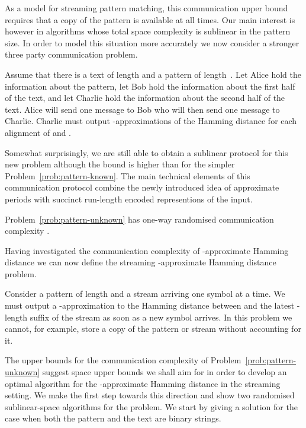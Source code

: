 As a model for streaming pattern matching, this communication upper bound requires that a copy of the pattern is available at all times.  Our main interest is however in algorithms whose total space complexity is sublinear in the pattern size. In order to model this situation more accurately we now consider a stronger three party communication problem.  

\begin{problem}\label{prob:pattern-unknown}
Assume that there is a text  of length  and a pattern  of length~. Let Alice hold the information about the pattern, let Bob hold the information about the first half of the text, and let Charlie hold the information about the second half of the text. Alice will send one message to Bob who will then send one message to Charlie. Charlie must output -approximations of the Hamming distance for each alignment of  and .
\end{problem}

Somewhat surprisingly, we are still able to obtain a sublinear protocol for this new problem although the bound is higher than for the simpler Problem~\ref{prob:pattern-known}.  The main technical elements of this communication protocol combine the newly introduced idea of approximate periods with succinct run-length encoded representions of the input.



\begin{theorem}\label{th:pattern-unknown}
Problem~\ref{prob:pattern-unknown} has one-way randomised communication complexity .
\end{theorem}

Having investigated the communication complexity of -approximate Hamming distance we can now define the streaming -approximate Hamming distance problem.

\begin{problem}\label{prob:streaming}
Consider a pattern  of length  and a stream arriving one symbol at a time. We must output a -approximation to the Hamming distance between  and the latest -length suffix of the stream as soon as a new symbol arrives. In this problem we cannot, for example, store a copy of the pattern or stream without accounting for it.
\end{problem}

The upper bounds for the communication complexity of Problem~\ref{prob:pattern-unknown} suggest space upper bounds we shall aim for in order to develop an optimal algorithm for the -approximate Hamming distance in the streaming setting. We make the first step towards this direction and show two randomised sublinear-space algorithms for the problem. We start by giving a solution for the case when both the pattern and the text are binary strings.  


